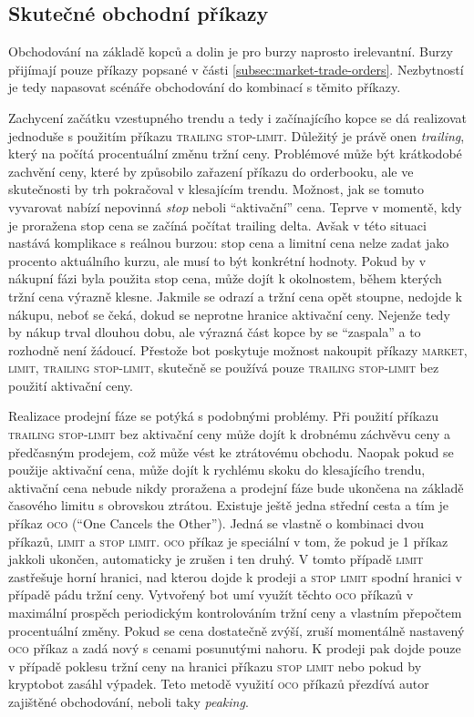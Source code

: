 \subsection{Skutečné obchodní příkazy}
Obchodování na základě kopců a dolin je pro burzy naprosto irelevantní. Burzy přijímají pouze příkazy popsané v části \ref{subsec:market-trade-orders}. Nezbytností je tedy napasovat scénáře
obchodování do kombinací s těmito příkazy.

Zachycení začátku vzestupného trendu a tedy i začínajícího kopce se dá realizovat jednoduše s použitím příkazu \textsc{trailing stop-limit}. Důležitý
je právě onen \emph{trailing}, který na počítá procentuální změnu tržní ceny. Problémové může být krátkodobé zachvění ceny, které by způsobilo zařazení příkazu do orderbooku, ale ve skutečnosti
by trh pokračoval v klesajícím trendu. Možnost, jak se tomuto vyvarovat nabízí nepovinná \emph{stop} neboli \enquote{aktivační} cena. Teprve v momentě, kdy je proražena stop cena se začíná počítat trailing
delta. Avšak v této situaci nastává komplikace s reálnou burzou: stop cena a limitní cena nelze zadat jako procento aktuálního kurzu, ale musí to být konkrétní hodnoty. Pokud by v nákupní fázi
byla použita stop cena, může dojít k okolnostem, během kterých tržní cena výrazně klesne. Jakmile se odrazí a tržní cena opět stoupne, nedojde k nákupu, neboť se čeká, dokud se neprotne hranice
aktivační ceny. Nejenže tedy by nákup trval dlouhou dobu, ale výrazná část kopce by se \enquote{zaspala} a to rozhodně není žádoucí. Přestože bot poskytuje možnost nakoupit příkazy \textsc{market,
    limit, trailing stop-limit}, skutečně se používá pouze \textsc{trailing stop-limit} bez použití aktivační ceny.

Realizace prodejní fáze se potýká s podobnými problémy. Při použití příkazu \textsc{trailing stop-limit} bez aktivační ceny může dojít k drobnému záchvěvu ceny a předčasným prodejem, což může
vést ke ztrátovému obchodu. Naopak pokud se použije aktivační cena, může dojít k rychlému skoku do klesajícího trendu, aktivační cena nebude nikdy proražena a prodejní fáze bude ukončena na základě
časového limitu s obrovskou ztrátou. Existuje ještě jedna střední cesta a tím je příkaz \textsc{oco} (\enquote{One Cancels the Other}). Jedná se vlastně o kombinaci dvou příkazů, \textsc{limit} a
\textsc{stop limit}. \textsc{oco} příkaz je speciální v tom, že pokud je 1 příkaz jakkoli ukončen, automaticky je zrušen i ten druhý. V tomto případě \textsc{limit} zastřešuje horní hranici, nad
kterou dojde k prodeji a \textsc{stop limit} spodní hranici v případě pádu tržní ceny. Vytvořený bot umí využít těchto \textsc{oco} příkazů v maximální prospěch periodickým kontrolováním tržní ceny
a vlastním přepočtem procentuální změny. Pokud se cena dostatečně zvýší, zruší momentálně nastavený \textsc{oco} příkaz a zadá nový s cenami posunutými nahoru. K prodeji pak dojde pouze v případě poklesu tržní
ceny na hranici příkazu \textsc{stop limit} nebo pokud by kryptobot zasáhl výpadek. Teto metodě využití \textsc{oco} příkazů přezdívá autor zajištěné obchodování, neboli taky \emph{peaking}.

